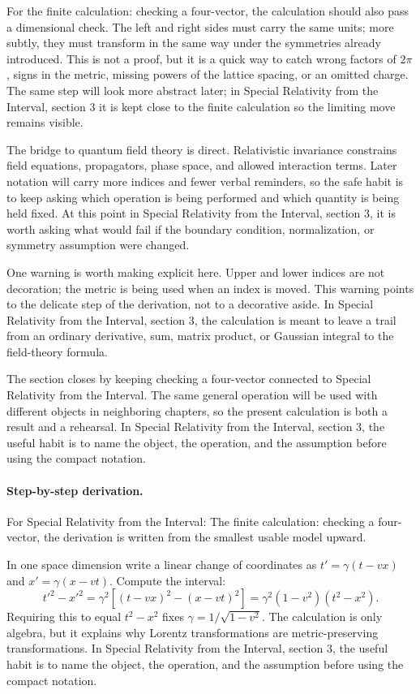For the finite calculation: checking a four-vector, the calculation should also pass a dimensional check.  The left and right sides must carry the same units; more subtly, they must transform in the same way under the symmetries already introduced.  This is not a proof, but it is a quick way to catch wrong factors of \(2\pi\), signs in the metric, missing powers of the lattice spacing, or an omitted charge.  The same step will look more abstract later; in Special Relativity from the Interval, section 3 it is kept close to the finite calculation so the limiting move remains visible.

The bridge to quantum field theory is direct.  Relativistic invariance constrains field equations, propagators, phase space, and allowed interaction terms.  Later notation will carry more indices and fewer verbal reminders, so the safe habit is to keep asking which operation is being performed and which quantity is being held fixed.  At this point in Special Relativity from the Interval, section 3, it is worth asking what would fail if the boundary condition, normalization, or symmetry assumption were changed.

One warning is worth making explicit here.  Upper and lower indices are not decoration; the metric is being used when an index is moved.  This warning points to the delicate step of the derivation, not to a decorative aside.  In Special Relativity from the Interval, section 3, the calculation is meant to leave a trail from an ordinary derivative, sum, matrix product, or Gaussian integral to the field-theory formula.

The section closes by keeping checking a four-vector connected to Special Relativity from the Interval.  The same general operation will be used with different objects in neighboring chapters, so the present calculation is both a result and a rehearsal.  In Special Relativity from the Interval, section 3, the useful habit is to name the object, the operation, and the assumption before using the compact notation.



\paragraph{Step-by-step derivation.}

For Special Relativity from the Interval: The finite calculation: checking a four-vector, the derivation is written from the smallest usable model upward.

In one space dimension write a linear change of coordinates as \(t'=\gamma(t-vx)\) and \(x'=\gamma(x-vt)\).  Compute the interval:
\[
  t'^2-x'^2
  =
  \gamma^2[(t-vx)^2-(x-vt)^2]
  =
  \gamma^2(1-v^2)(t^2-x^2).
\]
Requiring this to equal \(t^2-x^2\) fixes \(\gamma=1/\sqrt{1-v^2}\).  The calculation is only algebra, but it explains why Lorentz transformations are metric-preserving transformations.  In Special Relativity from the Interval, section 3, the useful habit is to name the object, the operation, and the assumption before using the compact notation.

